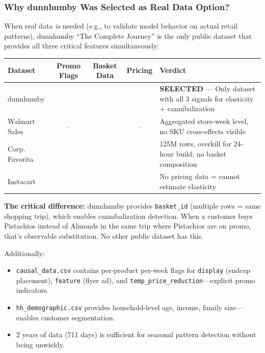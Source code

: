 \documentclass[11pt, a4paper]{article}
\newcommand{\cmark}{\ding{51}}  %
\newcommand{\xmark}{\ding{55}}  %
\begin{document}
\subsubsection{Why dunnhumby Was Selected as Real Data Option?}

When real data \textit{is} needed (e.g., to validate model behavior on actual retail patterns), dunnhumby ``The Complete Journey'' is the only public dataset that provides all three critical features simultaneously:

\begin{tabularx}{\textwidth}{| l | c | c | c | X |}
    \hline
    \textbf{Dataset} & \textbf{Promo Flags} & \textbf{Basket Data} & \textbf{Pricing} & \textbf{Verdict} \\
    \hline\hline
    dunnhumby & \textcolor{green}{\cmark} & \textcolor{green}{\cmark} & \textcolor{green}{\cmark} & \textbf{SELECTED} --- Only dataset with all 3 signals for elasticity + cannibalization \\
    \hline
    Walmart Sales & \textcolor{orange}{\~{}} & \textcolor{red}{\xmark} & \textcolor{orange}{\~{}} & Aggregated store-week level, no SKU cross-effects visible \\
    \hline
    Corp. Favorita & \textcolor{green}{\cmark} & \textcolor{red}{\xmark} & \textcolor{green}{\cmark} & 125M rows, overkill for 24-hour build; no basket composition \\
    \hline
    Instacart & \textcolor{red}{\xmark} & \textcolor{green}{\cmark} & \textcolor{red}{\xmark} & No pricing data = cannot estimate elasticity \\
    \hline
\end{tabularx}

\textbf{The critical difference:} dunnhumby provides \texttt{basket\_id} (multiple rows = same shopping trip), which enables cannibalization detection. When a customer buys Pistachios instead of Almonds in the same trip where Pistachios are on promo, that's observable substitution. No other public dataset has this.

Additionally:
\begin{itemize}[leftmargin=1.5em]
    \item \texttt{causal\_data.csv} contains per-product per-week flags for \texttt{display} (endcap placement), \texttt{feature} (flyer ad), and \texttt{temp\_price\_reduction}---explicit promo indicators.
    \item \texttt{hh\_demographic.csv} provides household-level age, income, family size---enables customer segmentation.
    \item 2 years of data (711 days) is sufficient for seasonal pattern detection without being unwieldy.
\end{itemize}
\end{document}
